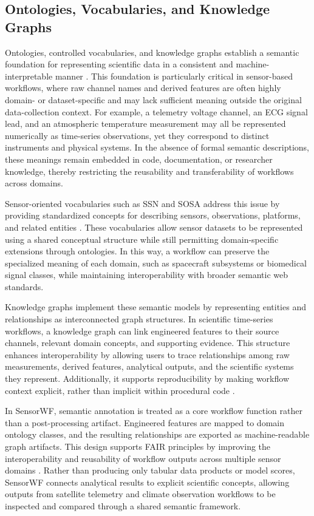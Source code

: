 \documentclass[conference]{IEEEtran}
\newcommand\Kellan[1]{\leavevmode{\footnotesize\textbf{[Kellan: #1]}}}
\begin{document}
\subsection{Ontologies, Vocabularies, and Knowledge Graphs}

Ontologies, controlled vocabularies, and knowledge graphs establish a semantic foundation for representing scientific data in a consistent and machine-interpretable manner \cite{wilkinson2016fair}. This foundation is particularly critical in sensor-based workflows, where raw channel names and derived features are often highly domain- or dataset-specific and may lack sufficient meaning outside the original data-collection context. For example, a telemetry voltage channel, an ECG signal lead, and an atmospheric temperature measurement may all be represented numerically as time-series observations, yet they correspond to distinct instruments and physical systems. In the absence of formal semantic descriptions, these meanings remain embedded in code, documentation, or researcher knowledge, thereby restricting the reusability and transferability of workflows across domains.

Sensor-oriented vocabularies such as SSN and SOSA address this issue by providing standardized concepts for describing sensors, observations, platforms, and related entities \cite{haller2019ssn}. These vocabularies allow sensor datasets to be represented using a shared conceptual structure while still permitting domain-specific extensions through ontologies. In this way, a workflow can preserve the specialized meaning of each domain, such as spacecraft subsystems or biomedical signal classes, while maintaining interoperability with broader semantic web standards.

Knowledge graphs implement these semantic models by representing entities and relationships as interconnected graph structures. In scientific time-series workflows, a knowledge graph can link engineered features to their source channels, relevant domain concepts, and supporting evidence. This structure enhances interoperability by allowing users to trace relationships among raw measurements, derived features, analytical outputs, and the scientific systems they represent. Additionally, it supports reproducibility by making workflow context explicit, rather than implicit within procedural code \cite{provo2013,missier2013provone}.

In SensorWF, semantic annotation is treated as a core workflow function rather than a post-processing artifact. Engineered features are mapped to domain ontology classes, and the resulting relationships are exported as machine-readable graph artifacts. This design supports FAIR principles by improving the interoperability and reusability of workflow outputs across multiple sensor domains \cite{wilkinson2016fair,gustafsson2025workflowhub}. Rather than producing only tabular data products or model scores, SensorWF connects analytical results to explicit scientific concepts, allowing outputs from satellite telemetry and climate observation workflows to be inspected and compared through a shared semantic framework.
\Kellan{iffy on this paragraph, rewriting later}
\end{document}
